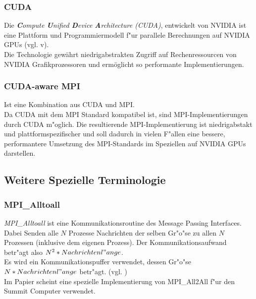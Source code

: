 \subsubsection{ CUDA }
Die \textit{\textbf{C}ompute \textbf{U}nified \textbf{D}evice \textbf{A}rchitecture (CUDA)}, entwickelt von NVIDIA ist eine Plattform und Programmiermodell f"ur parallele Berechnungen auf NVIDIA GPUs (vgl. \cite{cuda}v).\\
Die Technologie gewährt niedrigabstrakten Zugriff auf Rechenressourcen von NVIDIA Grafikprozessoren und ermöglicht so performante Implementierungen.

\subsubsection{ CUDA-aware MPI }
Ist eine Kombination aus CUDA und MPI.\\
Da CUDA mit dem MPI Standard kompatibel ist, sind MPI-Implementierungen durch CUDA m"oglich. Die resultierende MPI-Implementierung ist niedrigabstakt und plattformspezifischer und soll dadurch in vielen F"allen eine bessere, performantere Umsetzung des MPI-Standards im Speziellen auf NVIDIA GPUs darstellen.

\subsection{Weitere Spezielle Terminologie}

\subsubsection{MPI\_Alltoall}
\textit{MPI\_Alltoall} ist eine Kommunikationsroutine des Message Passing Interfaces. Dabei Senden alle $N$ Prozesse Nachrichten der selben Gr"o"se zu allen $N$ Prozessen (inklusive dem eigenen Prozess). Der Kommunikationsaufwand betr"agt also $N^2 * Nachrichtenl"ange$.\\
Es wird ein Kommunikationspuffer verwendet, dessen Gr"o"se $N*Nachrichtenl"ange$ betr"agt. (vgl. \cite{MPImanpage})\\
Im Papier \cite{mainpaper} scheint eine spezielle Implementierung von MPI\_All2All f"ur den Summit Computer verwendet.


